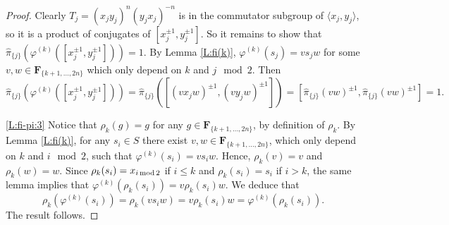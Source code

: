 \documentclass[12pt,reqno,a4paper]{article}
\theoremstyle{definition}
\theoremstyle{remark}
\numberwithin{equation}{section}
\numberwithin{figure}{section}
\newcommand{\B}[1]{{\mathbf #1}}
\begin{document}
\begin{proof}
Clearly $T_j=(x_jy_j)^n (y_jx_j)^{-n}$ is in the commutator subgroup of $\langle x_j,y_j \rangle$, so it is a product of conjugates of $[x_j^{\pm 1},y_j^{\pm 1}]$.
So it remains to show that $\widehat{\pi}_{\{j\}}(\varphi^{(k)}([x_j^{\pm 1},y_j^{\pm 1}]))=1$.
By Lemma \ref{L:fi(k)}, $\varphi^{(k)}(s_j) = vs_jw$ for some $v,w\in \B F_{\{k+1,\ldots,2n\}}$ which only depend on $k$ and $j \mod 2$. 
Then 
\[
\widehat{\pi}_{\{j\}}(\varphi^{(k)}([x_j^{\pm 1},y_j^{\pm 1}]))
=
\widehat{\pi}_{\{j\}} ([(vx_jw)^{\pm 1}, (vy_jw)^{\pm 1}]) 
=
[ \widehat{\pi}_{\{j\}}(vw)^{\pm 1} , \widehat{\pi}_{\{j\}}(vw)^{\pm 1} ] =1.
\]

\ref{L:fi-pi:3} 
Notice that $\rho_k(g) = g$ for any $g\in \B F_{\{k+1,\ldots,2n\}}$, by definition of $\rho_k$. 
By Lemma \ref{L:fi(k)}, for any $s_i \in S$ there exist $v,w \in \B F_{\{k+1,\dots,2n\}}$, which only depend on $k$ and $i \mod 2$, such that $\varphi^{(k)}(s_i)=vs_iw$.
Hence, $\rho_k(v)=v$ and $\rho_k(w)=w$.
Since $\rho_k(s_i)=x_{i \, {\rm mod} \, 2}$ if $i \leq k$ and $\rho_k(s_i)=s_i$ if $i>k$, the same lemma implies that $\varphi^{(k)}(\rho_k(s_i))=v \rho_k(s_i)w$.
We deduce that 
\[
\rho_k(\varphi^{(k)}(s_i))
=\rho_k(vs_iw)
=v\rho_k(s_i)w
=\varphi^{(k)}(\rho_k(s_i)).
\]
The result follows.
\end{proof}
\end{document}

